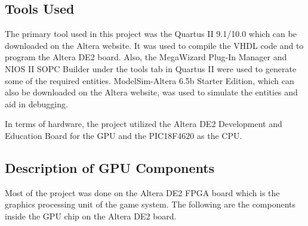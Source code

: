 \documentclass{report}
\begin{document}
\subsection{Tools Used}
The primary tool used in this project was the Quartus II 9.1/10.0 which 
can be downloaded on the Altera website. It was used to compile the VHDL 
code and to program the Altera DE2 board. Also, the MegaWizard Plug-In 
Manager and NIOS II SOPC Builder under the tools tab in Quartus II were 
used to generate some of the required entities. ModelSim-Altera 6.5b 
Starter Edition, which can also be downloaded on the Altera website, was 
used to simulate the entities and aid in debugging.

In terms of hardware, the project utilized the Altera DE2 Development 
and Education Board for the GPU and the PIC18F4620 as the CPU.

\subsection{Description of GPU Components}
Most of the project was done on the Altera DE2 FPGA board which is the 
graphics processing unit of the game system. The following are the 
components inside the GPU chip on the Altera DE2 board.
\end{document}
